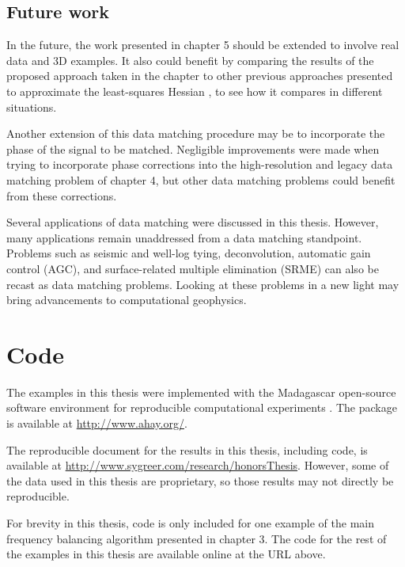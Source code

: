 \subsection{Future work}
In the future, the work presented in chapter 5 should be extended to involve real data and 3D examples. 
It also could benefit by comparing the results of the proposed approach taken in the chapter to other previous approaches presented to approximate the least-squares Hessian \cite[]{migdec,lsamp,siklsm,pwlsrtm,diagamp,debfilt,prestack,poststack}, to see how it compares in different situations.

Another extension of this data matching procedure may be to incorporate
the phase of the signal to be matched. 
Negligible improvements were made when trying to incorporate phase corrections into the high-resolution and legacy data matching problem of chapter 4, but other data matching problems could benefit from these corrections.

Several applications of data matching were discussed in this thesis. 
However, many applications remain unaddressed from a data matching standpoint. 
Problems such as seismic and well-log tying, deconvolution, automatic gain control (AGC), and surface-related multiple elimination (SRME) can also be recast as data matching problems. Looking at these problems in a new light may bring advancements to computational geophysics.



\appendix
\section{Code}
The examples in this thesis were implemented with the Madagascar open-source software environment for reproducible computational experiments \cite[]{madagascar}.
The package is available at \url{http://www.ahay.org/}.

The reproducible document for the results in this thesis, including code, is available at \url{http://www.sygreer.com/research/honorsThesis}.
However, some of the data used in this thesis are proprietary, so those results may not directly be reproducible.

For brevity in this thesis, code is only included for one example of the main frequency balancing algorithm presented in chapter 3.
The code for the rest of the examples in this thesis are available online at the URL above.

